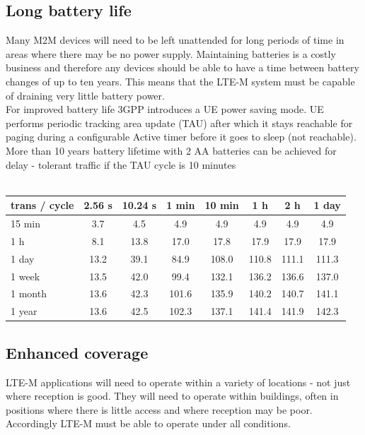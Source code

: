 \documentclass[12pt]{article}
\newcommand\tab[1][1cm]{\hspace*{#1}}
\begin{document}
\begin{description}
\subsection{Long battery life}
 \item[\label{Long battery life}]{
\tab Many M2M devices will need to be left unattended for long periods of time in areas where there may be no power supply. Maintaining batteries is a costly business and therefore any devices should be able to have a time between battery changes of up to ten years. This means that the LTE-M system must be capable of draining very little battery power. \\
For improved battery life 3GPP introduces a UE power saving mode. UE performs periodic tracking area update (TAU) after which it stays reachable for paging during a configurable Active timer before it goes to sleep (not reachable).\\
More than 10 years battery lifetime with 2 AA batteries can be achieved for delay - tolerant traffic if the TAU cycle is 10 minutes\\\\
\begin{tabular}{|l|c|c|c|c|c|c|c|}
\hline
trans / cycle & 2.56 s &10.24 s & 1 min & 10 min & 1 h & 2 h & 1 day \\
\hline 
15 min & 3.7 & 4.5 & 4.9 & 4.9 & 4.9 & 4.9 & 4.9 \\
\hline 
1 h & 8.1 & 13.8 & 17.0 & 17.8 & 17.9 & 17.9 & 17.9 \\
\hline 
1 day & 13.2 & 39.1 & 84.9 & 108.0 & 110.8 & 111.1 & 111.3 \\
\hline 
1 week & 13.5 & 42.0 & 99.4 & 132.1 & 136.2 & 136.6 & 137.0 \\
\hline 
1 month & 13.6 & 42.3 & 101.6 & 135.9 & 140.2 & 140.7 & 141.1 \\
\hline 
1 year & 13.6 & 42.5 & 102.3 & 137.1 & 141.4 & 141.9 & 142.3 \\
\hline 
\end{tabular} 
}

\subsection{Enhanced coverage}
 \item[\label{Enhanced coverage}]{
\tab LTE-M applications will need to operate within a variety of locations - not just
where reception is good. They will need to operate within buildings, often in
positions where there is little access and where reception may be poor.
Accordingly LTE-M must be able to operate under all conditions.
} 


\end{description}
\end{document}
